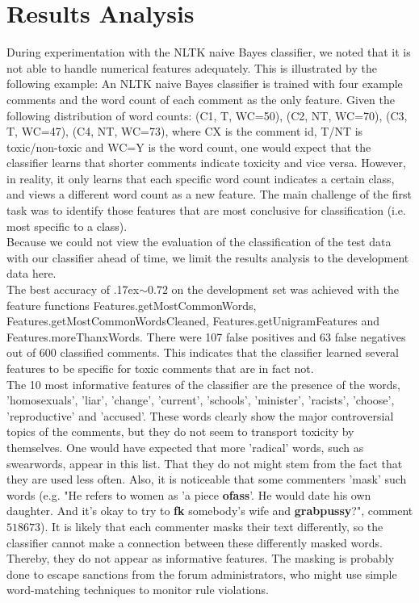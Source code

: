 \documentclass[11pt,a4paper]{article}
\begin{document}
\section{Results Analysis}
During experimentation with the NLTK naive Bayes classifier, we noted that it is not able to handle numerical features adequately. This is illustrated by the following example: An NLTK naive Bayes classifier is trained with four example comments and the word count of each comment as the only feature. Given the following distribution of word counts: (C1, T, WC=50), (C2, NT, WC=70), (C3, T, WC=47), (C4, NT, WC=73), where CX is the comment id, T/NT is toxic/non-toxic and WC=Y is the word count, one would expect that the classifier learns that shorter comments indicate toxicity and vice versa. However, in reality, it only learns that each specific word count indicates a certain class, and views a different word count as a new feature. The main challenge of the first task was to identify those features that are most conclusive for classification (i.e. most specific to a class). \\
Because we could not view the evaluation of the classification of the test data with our classifier ahead of time, we limit the results analysis to the development data here. \\
The best accuracy of {\raise.17ex\hbox{$\scriptstyle\mathtt{\sim}$}}$0.72$ on the development set was achieved with the feature functions Features.getMostCommonWords, Features.getMostCommonWordsCleaned, Features.getUnigramFeatures and Features.moreThanxWords. There were 107 false positives and 63 false negatives out of 600 classified comments. This indicates that the classifier learned several features to be specific for toxic comments that are in fact not. \\
The 10 most informative features of the classifier are the presence of the words, 'homosexuals', 'liar', 'change', 'current', 'schools', 'minister', 'racists', 'choose', 'reproductive' and 'accused'. These words clearly show the major controversial topics of the comments, but they do not seem to transport toxicity by themselves. One would have expected that more 'radical' words, such as swearwords, appear in this list. That they do not might stem from the fact that they are used less often. Also, it is noticeable that some commenters 'mask' such words (e.g. "He refers to women as 'a piece \textbf{ofass}'. He would date his own daughter. And it's
okay to try to \textbf{fk} somebody's wife and \textbf{grabpussy}?", comment $518673$). It is likely that each commenter masks their text differently, so the classifier cannot make a connection between these differently masked words. Thereby, they do not appear as informative features. The masking is probably done to escape sanctions from the forum administrators, who might use simple word-matching techniques to monitor rule violations. \\
\end{document}
